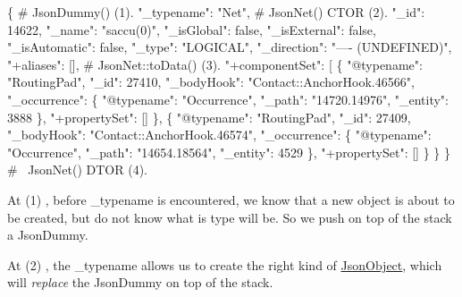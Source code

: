 \begin{DoxyCode}
\{                          # JsonDummy()  (1).
  \textcolor{stringliteral}{"\_typename"}: \textcolor{stringliteral}{"Net"},      # JsonNet()  CTOR (2).
  \textcolor{stringliteral}{"\_id"}: 14622,
  \textcolor{stringliteral}{"\_name"}: \textcolor{stringliteral}{"saccu(0)"},
  \textcolor{stringliteral}{"\_isGlobal"}: \textcolor{keyword}{false},
  \textcolor{stringliteral}{"\_isExternal"}: \textcolor{keyword}{false},
  \textcolor{stringliteral}{"\_isAutomatic"}: \textcolor{keyword}{false},
  \textcolor{stringliteral}{"\_type"}: \textcolor{stringliteral}{"LOGICAL"},
  \textcolor{stringliteral}{"\_direction"}: \textcolor{stringliteral}{"---- (UNDEFINED)"},
  \textcolor{stringliteral}{"+aliases"}: [],          # JsonNet::toData()  (3).
  \textcolor{stringliteral}{"+componentSet"}: [
    \{
      \textcolor{stringliteral}{"@typename"}: \textcolor{stringliteral}{"RoutingPad"},
      \textcolor{stringliteral}{"\_id"}: 27410,
      \textcolor{stringliteral}{"\_bodyHook"}: \textcolor{stringliteral}{"Contact::AnchorHook.46566"},
      \textcolor{stringliteral}{"\_occurrence"}: \{
        \textcolor{stringliteral}{"@typename"}: \textcolor{stringliteral}{"Occurrence"},
        \textcolor{stringliteral}{"\_path"}: \textcolor{stringliteral}{"14720.14976"},
        \textcolor{stringliteral}{"\_entity"}: 3888
      \},
      \textcolor{stringliteral}{"+propertySet"}: []
    \},
    \{
      \textcolor{stringliteral}{"@typename"}: \textcolor{stringliteral}{"RoutingPad"},
      \textcolor{stringliteral}{"\_id"}: 27409,
      \textcolor{stringliteral}{"\_bodyHook"}: \textcolor{stringliteral}{"Contact::AnchorHook.46574"},
      \textcolor{stringliteral}{"\_occurrence"}: \{
        \textcolor{stringliteral}{"@typename"}: \textcolor{stringliteral}{"Occurrence"},
        \textcolor{stringliteral}{"\_path"}: \textcolor{stringliteral}{"14654.18564"},
        \textcolor{stringliteral}{"\_entity"}: 4529
      \},
      \textcolor{stringliteral}{"+propertySet"}: []
    \}
  \}
\}                          # ~JsonNet()  DTOR (4). 
\end{DoxyCode}


At {\ttfamily }(1) , before {\ttfamily \-\_\-typename} is encountered, we know that a new object is about to be created, but do not know what is type will be. So we push on top of the stack a {\ttfamily Json\-Dummy}.

At {\ttfamily }(2) , the {\ttfamily \-\_\-typename} allows us to create the right kind of \hyperlink{classHurricane_1_1JsonObject}{Json\-Object}, which will {\itshape replace} the {\ttfamily Json\-Dummy} on top of the stack.

